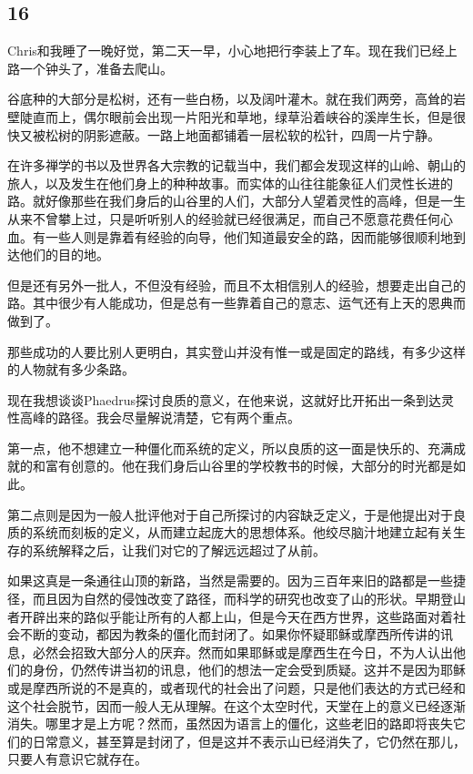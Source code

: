 \documentclass[UTF8]{article}
\begin{document}
\subsection*{16}
\par Chris和我睡了一晚好觉，第二天一早，小心地把行李装上了车。现在我们已经上路一个钟头了，准备去爬山。
\par 谷底种的大部分是松树，还有一些白杨，以及阔叶灌木。就在我们两旁，高耸的岩壁陡直而上，偶尔眼前会出现一片阳光和草地，绿草沿着峡谷的溪岸生长，但是很快又被松树的阴影遮蔽。一路上地面都铺着一层松软的松针，四周一片宁静。
\par 在许多禅学的书以及世界各大宗教的记载当中，我们都会发现这样的山岭、朝山的旅人，以及发生在他们身上的种种故事。而实体的山往往能象征人们灵性长进的路。就好像那些在我们身后的山谷里的人们，大部分人望着灵性的高峰，但是一生从来不曾攀上过，只是听听别人的经验就已经很满足，而自己不愿意花费任何心血。有一些人则是靠着有经验的向导，他们知道最安全的路，因而能够很顺利地到达他们的目的地。
\par 但是还有另外一批人，不但没有经验，而且不太相信别人的经验，想要走出自己的路。其中很少有人能成功，但是总有一些靠着自己的意志、运气还有上天的恩典而做到了。
\par 那些成功的人要比别人更明白，其实登山并没有惟一或是固定的路线，有多少这样的人物就有多少条路。
\par 现在我想谈谈Phaedrus探讨良质的意义，在他来说，这就好比开拓出一条到达灵性高峰的路径。我会尽量解说清楚，它有两个重点。
\par 第一点，他不想建立一种僵化而系统的定义，所以良质的这一面是快乐的、充满成就的和富有创意的。他在我们身后山谷里的学校教书的时候，大部分的时光都是如此。
\par 第二点则是因为一般人批评他对于自己所探讨的内容缺乏定义，于是他提出对于良质的系统而刻板的定义，从而建立起庞大的思想体系。他绞尽脑汁地建立起有关生存的系统解释之后，让我们对它的了解远远超过了从前。
\par 如果这真是一条通往山顶的新路，当然是需要的。因为三百年来旧的路都是一些捷径，而且因为自然的侵蚀改变了路径，而科学的研究也改变了山的形状。早期登山者开辟出来的路似乎能让所有的人都上山，但是今天在西方世界，这些路面对着社会不断的变动，都因为教条的僵化而封闭了。如果你怀疑耶稣或摩西所传讲的讯息，必然会招致大部分人的厌弃。然而如果耶稣或是摩西生在今日，不为人认出他们的身份，仍然传讲当初的讯息，他们的想法一定会受到质疑。这并不是因为耶稣或是摩西所说的不是真的，或者现代的社会出了问题，只是他们表达的方式已经和这个社会脱节，因而一般人无从理解。在这个太空时代，天堂在上的意义已经逐渐消失。哪里才是上方呢？然而，虽然因为语言上的僵化，这些老旧的路即将丧失它们的日常意义，甚至算是封闭了，但是这并不表示山已经消失了，它仍然在那儿，只要人有意识它就存在。
\end{document}
